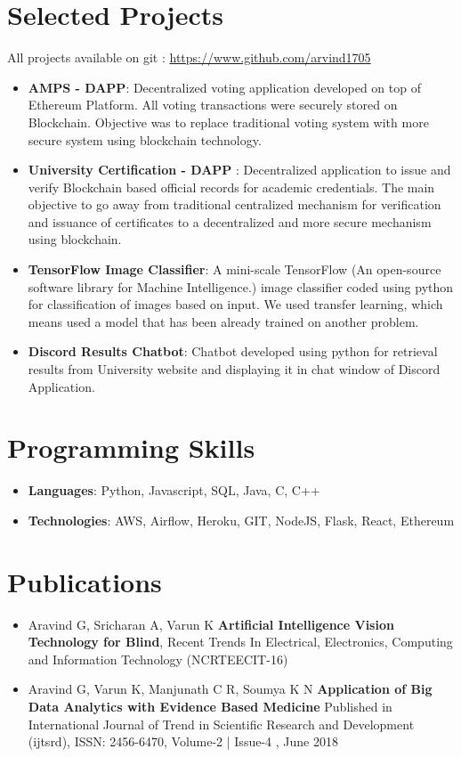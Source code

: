 \documentclass[letterpaper,11pt]{article}
\newcommand{\resumeItem}[2]{
  \item\small{
    \textbf{#1}{: #2 \vspace{-2pt}}
  }
}
\newcommand{\resumeSubItem}[2]{\resumeItem{#1}{#2}\vspace{-4pt}}
\newcommand{\resumeSubHeadingListStart}{\begin{itemize}[leftmargin=*]}
\newcommand{\resumeSubHeadingListEnd}{\end{itemize}}
\begin{document}
\section{Selected Projects} All projects available on git : \url{https://www.github.com/arvind1705}
  \resumeSubHeadingListStart
    \resumeSubItem{AMPS - DAPP}
      {Decentralized voting application developed on top of Ethereum Platform. All voting transactions were securely stored on Blockchain. Objective was to replace traditional voting system with more secure system using blockchain technology. }
    \resumeSubItem{University Certification - DAPP }
      {Decentralized application to issue and verify Blockchain based official records for academic credentials. The main objective to go away from traditional centralized mechanism for verification and issuance of certificates to a decentralized and more secure mechanism using blockchain. }
    \resumeSubItem{TensorFlow Image Classifier}
      {A mini-scale TensorFlow (An open-source software library for
      Machine Intelligence.) image classifier coded using python for classification of images based on
      input. We used transfer learning, which means used a model that has been already trained on
      another problem.}
    \resumeSubItem{Discord Results Chatbot}
      {Chatbot developed using python for retrieval results from University website and displaying it in chat window of Discord Application.}
  \resumeSubHeadingListEnd


\section{Programming Skills}
\resumeSubHeadingListStart
  \item{
    \textbf{Languages}{: Python, Javascript, SQL, Java, C, C++}
  }
  \item {
    \textbf{Technologies}{: AWS, Airflow, Heroku, GIT, NodeJS, Flask, React, Ethereum}
  }
\resumeSubHeadingListEnd

\section{Publications}
 \resumeSubHeadingListStart
   \item{
    Aravind G, Sricharan A, Varun K \textbf{Artificial Intelligence Vision Technology for
    Blind}, Recent Trends In Electrical, Electronics, Computing and
    Information Technology (NCRTEECIT-16)
   }
   \item  Aravind G, Varun K, Manjunath C R, Soumya K N
   \textbf{Application of Big Data Analytics with Evidence Based Medicine}
   Published in International Journal of Trend in Scientific Research and Development (ijtsrd), 
   ISSN: 2456-6470, Volume-2 | Issue-4 , June 2018
 \resumeSubHeadingListEnd

 


\end{document}
